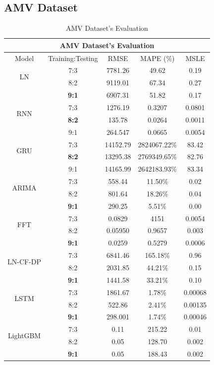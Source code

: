 \documentclass{ieeeojies}
\begin{document}
\subsection{AMV Dataset} 
\begin{table}[H]
    \centering
    \begin{tabular}{|c|c|c|c|c|}
         \hline
         \multicolumn{5}{|c|}{\textbf{AMV Dataset's Evaluation}}\\
         \hline
         \centering Model & Training:Testing & RMSE & MAPE (\%) & MSLE\\
         \hline
         \multirow{2}{*}{LN}& 7:3 & 7781.26 & 49.62 & 0.19\\ & 8:2 & 9119.01 & 67.34 & 0.27\\ & \textbf{9:1}& 6907.31& 51.82 & 0.17\\
         \hline
         \multirow{2}{*}{RNN} & 7:3&1276.19&0.3207&0.0801\\ & \textbf{8:2}&135.78&0.0264&0.0011\\ & 9:1  &264.547 &0.0665 &0.0054 \\
         \hline
         \multirow{2}{*}{GRU} & 7:3	& 14152.79 & 2824067.22\% & 83.42 \\ & \textbf{8:2} & 13295.38 & 2769349.65\% & 82.76 \\ & 9:1 & 14165.99 & 2642183.93\% & 83.34 \\
         \hline
         \multirow{2}{*}{ARIMA} & 7:3 & 558.44 & 11.50\% & 0.02 \\ & 8:2 & 801.64 & 18.26\% & 0.04 \\ & \textbf{9:1} & 290.25 & 5.51\% & 0.00\\
         \hline
         \multirow{2}{*}{FFT}& 7:3	& 0.0829& 4151& 0.0054\\ & 8:2 & 0.05950& 0.9657& 0.003\\ & \textbf{9:1} & 0.0259& 0.5279& 0.0006\\
         \hline
         \multirow{2}{*}{LN-CF-DP} & 7:3 & 6841.46 & 165.18\% & 0.96 \\ & 8:2 &2031.85	& 44.21\%&  0.15 \\ & \textbf{9:1} &1441.58&33.21\% & 0.10\\
         \hline
         \multirow{2}{*}{LSTM}& 7:3& 1861.67& 1.78\%& 0.00068\\ & 8:2 & 522.86& 2.41\%& 0.00135\\ & \textbf{9:1}& 298.001& 1.74\%& 0.00046\\
         \hline
         \multirow{2}{*}{LightGBM}& 7:3& 0.11& 215.22 & 0.01\\ & 8:2 & 0.05& 128.70 & 0.002\\ & \textbf{9:1}& 0.05& 188.43 & 0.002\\
         \hline
    \end{tabular}
    \caption{AMV Dataset's Evaluation}
    \label{vcbresult}
\end{table}
\end{document}
